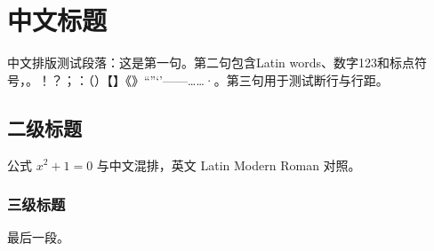\documentclass[a4paper,10pt,UTF8,scheme=chinese]{ctexart}
\begin{document}
\section{中文标题}
中文排版测试段落：这是第一句。第二句包含Latin words、数字123和标点符号，。！？；：（）【】《》“”‘’——……·。第三句用于测试断行与行距。
\subsection{二级标题}
公式 $x^2+1=0$ 与中文混排，英文 Latin Modern Roman 对照。
\subsubsection{三级标题}
最后一段。
\end{document}
